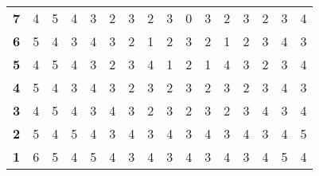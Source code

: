 \documentclass{article}
\begin{document}
\begin{table}[H]
\begin{tabular}{llllllllllllllll}
\multicolumn{1}{l|}{\textbf{7}}  & 4          & 5          & 4          & 3          & 2          & 3          & 2          & 3          & 0          & 3          & 2          & 3          & 2          & 3          & 4          \\
\multicolumn{1}{l|}{\textbf{6}}  & 5          & 4          & 3          & 4          & 3          & 2          & 1          & 2          & 3          & 2          & 1          & 2          & 3          & 4          & 3          \\
\multicolumn{1}{l|}{\textbf{5}}  & 4          & 5          & 4          & 3          & 2          & 3          & 4          & 1          & 2          & 1          & 4          & 3          & 2          & 3          & 4          \\
\multicolumn{1}{l|}{\textbf{4}}  & 5          & 4          & 3          & 4          & 3          & 2          & 3          & 2          & 3          & 2          & 3          & 2          & 3          & 4          & 3          \\
\multicolumn{1}{l|}{\textbf{3}}  & 4          & 5          & 4          & 3          & 4          & 3          & 2          & 3          & 2          & 3          & 2          & 3          & 4          & 3          & 4          \\
\multicolumn{1}{l|}{\textbf{2}}  & 5          & 4          & 5          & 4          & 3          & 4          & 3          & 4          & 3          & 4          & 3          & 4          & 3          & 4          & 5          \\
\multicolumn{1}{l|}{\textbf{1}}  & 6          & 5          & 4          & 5          & 4          & 3          & 4          & 3          & 4          & 3          & 4          & 3          & 4          & 5          & 4         
\end{tabular}
\end{table}
\end{document}
